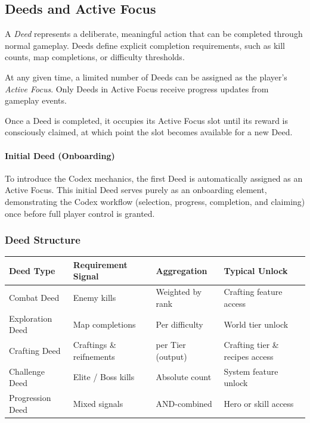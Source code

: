 \subsection{Deeds and Active Focus}

A \emph{Deed} represents a deliberate, meaningful action that can be completed through normal gameplay.
Deeds define explicit completion requirements, such as kill counts, map completions, or difficulty thresholds.

At any given time, a limited number of Deeds can be assigned as the player's \emph{Active Focus}.
Only Deeds in Active Focus receive progress updates from gameplay events.

Once a Deed is completed, it occupies its Active Focus slot until its reward is consciously claimed,
at which point the slot becomes available for a new Deed.

\paragraph{Initial Deed (Onboarding)}

To introduce the Codex mechanics, the first Deed is automatically assigned as an Active Focus.
This initial Deed serves purely as an onboarding element, demonstrating the Codex workflow
(selection, progress, completion, and claiming) once before full player control is granted.


\subsubsection{Deed Structure}

\begin{center}
	\begin{tabular}{|l|l|l|l|}
		\hline
		\textbf{Deed Type} & \textbf{Requirement Signal} & \textbf{Aggregation} & \textbf{Typical Unlock} \\
		\hline
		Combat Deed & Enemy kills & Weighted by rank & Crafting feature access \\
		\hline
		Exploration Deed & Map completions & Per difficulty & World tier unlock \\
		\hline
		Crafting Deed & Craftings \& reifnements & per Tier (output) & Crafting tier \& recipes access \\
		\hline
		Challenge Deed & Elite / Boss kills & Absolute count & System feature unlock \\
		\hline
		Progression Deed & Mixed signals & AND-combined & Hero or skill access \\
		\hline
	\end{tabular}
\end{center}

